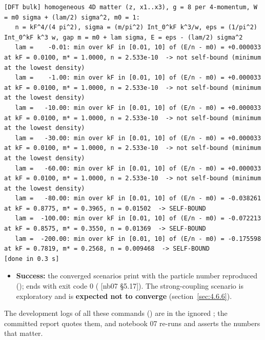 \begin{Verbatim}
[DFT bulk] homogeneous 4D matter (z, x1..x3), g = 8 per 4-momentum, W = m0 sigma + (lam/2) sigma^2, m0 = 1:
   n = kF^4/(4 pi^2), sigma = (m/pi^2) Int_0^kF k^3/w, eps = (1/pi^2) Int_0^kF k^3 w, gap m = m0 + lam sigma, E = eps - (lam/2) sigma^2
   lam =    -0.01: min over kF in [0.01, 10] of (E/n - m0) = +0.000033 at kF = 0.0100, m* = 1.0000, n = 2.533e-10  -> not self-bound (minimum at the lowest density)
   lam =    -1.00: min over kF in [0.01, 10] of (E/n - m0) = +0.000033 at kF = 0.0100, m* = 1.0000, n = 2.533e-10  -> not self-bound (minimum at the lowest density)
   lam =   -10.00: min over kF in [0.01, 10] of (E/n - m0) = +0.000033 at kF = 0.0100, m* = 1.0000, n = 2.533e-10  -> not self-bound (minimum at the lowest density)
   lam =   -30.00: min over kF in [0.01, 10] of (E/n - m0) = +0.000033 at kF = 0.0100, m* = 1.0000, n = 2.533e-10  -> not self-bound (minimum at the lowest density)
   lam =   -60.00: min over kF in [0.01, 10] of (E/n - m0) = +0.000033 at kF = 0.0100, m* = 1.0000, n = 2.533e-10  -> not self-bound (minimum at the lowest density)
   lam =   -80.00: min over kF in [0.01, 10] of (E/n - m0) = -0.038261 at kF = 0.8775, m* = 0.3965, n = 0.01502  -> SELF-BOUND
   lam =  -100.00: min over kF in [0.01, 10] of (E/n - m0) = -0.072213 at kF = 0.8575, m* = 0.3550, n = 0.01369  -> SELF-BOUND
   lam =  -200.00: min over kF in [0.01, 10] of (E/n - m0) = -0.175598 at kF = 0.7819, m* = 0.2568, n = 0.009468  -> SELF-BOUND
[done in 0.3 s]
\end{Verbatim}

\begin{itemize}
  \item \textbf{Success:} the converged scenarios print  with the particle number reproduced ();  ends with exit code 0 ( [nb07 \S{}5.17]). The strong-coupling scenario is exploratory and is \textbf{expected not to converge} (section~\ref{sec:4.6.6}).
\end{itemize}

The development logs of all these commands () are in the ignored ; the committed report  quotes them, and notebook 07 re-runs and asserts the numbers that matter.

